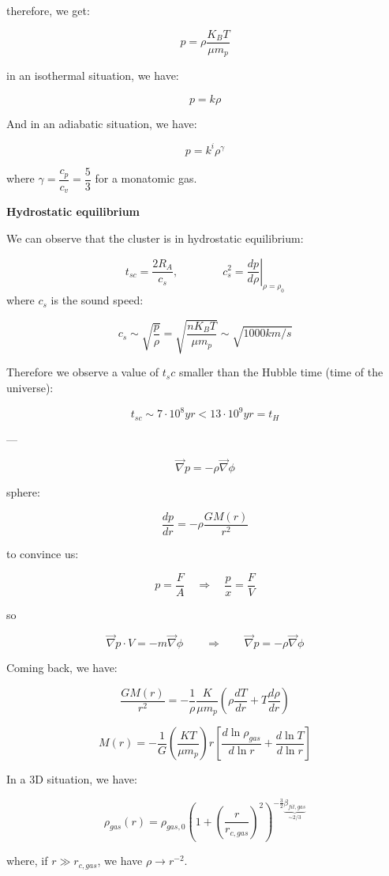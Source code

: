 therefore, we get:

$$
\boxed{p = \rho \dfrac{K_B T}{\mu m_p}}
$$

in an isothermal situation, we have:

$$
p = k \rho
$$

And in an adiabatic situation, we have:

$$
p = k^i \rho^{\gamma}
$$

where $\gamma = \dfrac{c_p}{c_v} = \dfrac{5}{3}$ for a monatomic gas.

\textbf{Hydrostatic equilibrium}

We can observe that the cluster is in hydrostatic equilibrium:

$$
t_{sc} = \dfrac{2 R_A}{c_s},
\qquad \qquad
c_s^2 = \left.\dfrac{dp}{d\rho} \right|_{\rho = \rho_0}
$$
where $c_s$ is the sound speed:

$$
c_s \sim \sqrt {\dfrac p \rho} = \sqrt {\dfrac{n K_B T}{\mu m_p}} \sim \sqrt{1000 km/s}
$$

Therefore we observe a value of $t_sc$ smaller than the Hubble time (time of the universe):

$$
t_{sc} \sim 7 \cdot 10^8 yr < 13 \cdot 10^9 yr = t_H
$$

---

$$
\vec \nabla p = - \rho \vec \nabla \phi
$$

sphere:

$$
\dfrac {dp}{dr} = - \rho \dfrac {G M(r)}{r^2}
$$

to convince us:

$$
p = \dfrac FA \quad \Rightarrow \quad \dfrac px = \dfrac FV
$$

so 

$$
\vec \nabla p \cdot V = -m \vec \nabla \phi
\qquad \Rightarrow \qquad
\vec \nabla p = - \rho \vec \nabla \phi
$$

Coming back, we have:

$$
\dfrac{GM(r)}{r^2} =  - \dfrac 1{\rho} \dfrac{K}{\mu m_p} \left( \rho \dfrac{dT}{dr} + T \dfrac{d\rho}{dr} \right)
$$

$$
M(r) = - \dfrac 1{G} \left( \dfrac{KT}{\mu m_p} \right) r \left[ \dfrac{d \ln \rho_{gas}}{d \ln r} + \dfrac{d \ln T}{d \ln r} \right]
$$

In a 3D situation, we have:

$$
\rho_{gas}(r) = \rho_{gas, 0} \left( 1 + \left( \dfrac{r}{r_{c, gas}} \right)^2 \right)^{-\frac{3}{2} \underbrace{\beta_{fit, gas}}_{\sim 2/3}}
$$

where, if $ r \gg r_{c, gas} $, we have $\rho \to r^{-2}$.

